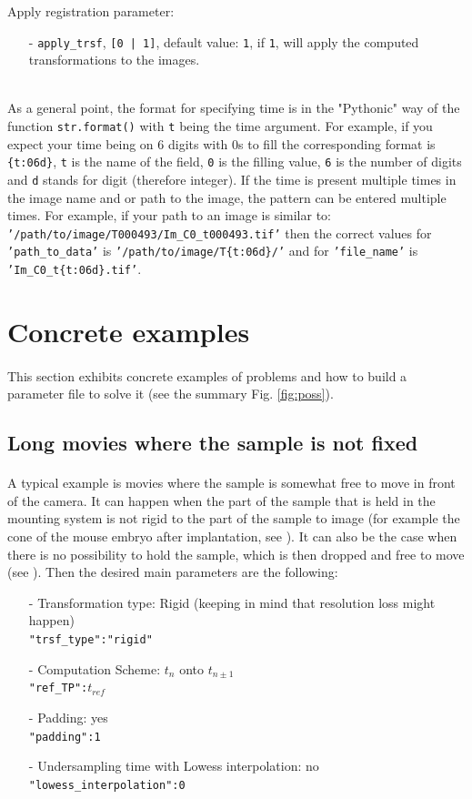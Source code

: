 \documentclass[10pt,a4paper]{article}
\newcommand{\option}[1]{{\texttt{'#1'}}}
\begin{document}
Apply registration parameter:
\begin{itemize}
\item[-] \texttt{apply\_trsf}, \texttt{[0 | 1]}, default value: \texttt{1}, if \texttt{1}, will apply the computed transformations to the images.
\end{itemize}~\\
As a general point, the format for specifying time is in the "Pythonic" way of the function \texttt{str.format()} with \texttt{t} being the time argument. For example, if you expect your time being on 6 digits with 0s to fill the corresponding format is \texttt{\{t:06d\}}, \texttt{t} is the name of the field, \texttt{0} is the filling value, \texttt{6} is the number of digits and \texttt{d} stands for digit (therefore integer). If the time is present multiple times in the image name and or path to the image, the pattern can be entered multiple times. For example, if your path to an image is similar to: \option{/path/to/image/T000493/Im\_C0\_t000493.tif} then the correct values for \option{path\_to\_data} is \option{/path/to/image/T\{t:06d\}/} and for \option{file\_name} is \option{Im\_C0\_t\{t:06d\}.tif}.
\section{Concrete examples}
\paragraph{}This section exhibits concrete examples of problems and how to build a parameter file to solve it (see the summary Fig. \ref{fig:poss}).
\subsection{Long movies where the sample is not fixed}
\paragraph{}A typical example is movies where the sample is somewhat free to move in front of the camera. It can happen when the part of the sample that is held in the mounting system is not rigid to the part of the sample to image (for example the cone of the mouse embryo after implantation, see \citep{McDole:2018aa}). It can also be the case when there is no possibility to hold the sample, which is then dropped and free to move (see \citep{Guignard:2017aa}). Then the desired main parameters are the following:
	\begin{itemize}
		\item[-] Transformation type: Rigid (keeping in mind that resolution loss might happen)\\
					\texttt{"trsf\_type":"rigid"}
		\item[-] Computation Scheme: $t_n$ onto $t_{n\pm 1}$\\
					\texttt{"ref\_TP":$t_{ref}$}
		\item[-] Padding: yes\\
					\texttt{"padding":1}
		\item[-] Undersampling time with Lowess interpolation: no\\
					\texttt{"lowess\_interpolation":0}
	\end{itemize}
\end{document}

